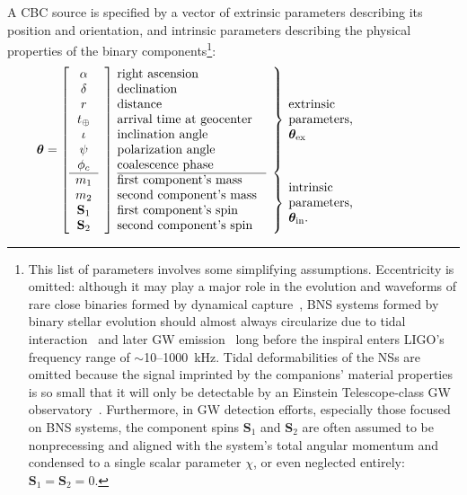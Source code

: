 \documentclass[amsmath,amssymb,aps,prx,reprint,nopreprintnumbers,nofootinbib,showpacs]{revtex4-1}
\begin{document}
A \ac{CBC} source is specified by a vector of extrinsic parameters describing its position and orientation, and intrinsic parameters describing the physical properties of the binary components\footnote{This list of parameters involves some simplifying assumptions. Eccentricity is omitted: although it may play a major role in the evolution and waveforms of rare close binaries formed by dynamical capture~\citep{PhysRevD.87.043004,2013PhRvD..87l7501H,2014PhRvD..90h4016H}, \ac{BNS} systems formed by binary stellar evolution should almost always circularize due to tidal interaction~\citep{0004-637X-572-1-407} and later \ac{GW} emission~\citep{PhysRev.136.B1224} long before the inspiral enters LIGO's frequency range of $\sim$10\nobreakdashes--1000~kHz. Tidal deformabilities of the \acp{NS} are omitted because the signal imprinted by the companions' material properties is so small that it will only be detectable by an Einstein Telescope\nobreakdashes-class \ac{GW} observatory~\citep{PhysRevD.81.123016}. Furthermore, in \ac{GW} detection efforts, especially those focused on \ac{BNS} systems, the component spins $\mathbf{S}_1$ and $\mathbf{S}_2$ are often assumed to be nonprecessing and aligned with the system's total angular momentum and condensed to a single scalar parameter $\chi$, or even neglected entirely: $\mathbf{S}_1 = \mathbf{S}_2 = 0$.}:
%
\begin{equation}\label{eq:params}
    \bm\theta = \left[
    \begin{array}{cl@{\quad}p{4cm}lp{3.75cm}}
        \alpha & \rdelim]{11}{0mm} & right ascension & \rdelim\}{7}{1mm} & \multirow{7}{2cm}{extrinsic parameters, $\bm\theta_\mathrm{ex}$} \\
        \delta && declination & \\
        r && distance & \\
        t_\oplus && arrival time at geocenter & \\
        \iota && inclination angle & \\
        \psi && polarization angle & \\
        \phi_c && coalescence phase & \\
        \cline{1-1}\cline{3-3}
        m_1 && first component's mass & \rdelim\}{4}{1mm} & \multirow{4}{2cm}{intrinsic parameters, $\bm\theta_\mathrm{in}$.}\\
        m_2 && second component's mass & \\
        \mathbf S_1 && first component's spin & \\
        \mathbf S_2 && second component's spin & \\
    \end{array}\right.
\end{equation}
\end{document}
